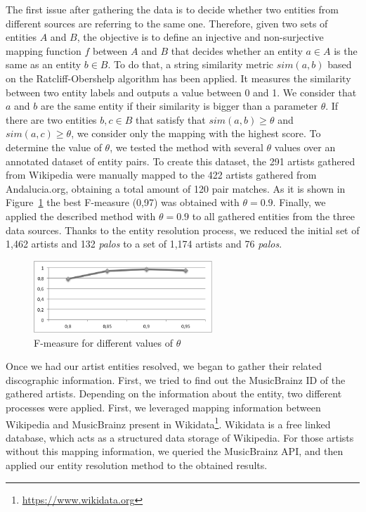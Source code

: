 The first issue after gathering the data is to decide whether two entities from different sources are referring to the same one. Therefore, given two sets of entities $A$ and $B$, the objective is to define an injective and non-surjective mapping function $f$ between $A$ and $B$ that decides whether an entity $a \in A$ is the same as an entity $b \in B$. To do that, a string similarity metric $sim(a,b)$ based on the Ratcliff-Obershelp algorithm \citep{Ratcliff1988} has been applied. It measures the similarity between two entity labels and outputs a value between 0 and 1. We consider that $a$ and $b$ are the same entity if their similarity is bigger than a parameter $\theta$. If there are two entities $b, c \in B$ that satisfy that $sim(a,b) \geq \theta$ and $sim(a,c) \geq \theta$, we consider only the mapping with the highest score. To determine the value of $\theta$, we tested the method with several $\theta$ values over an annotated dataset of entity pairs. To create this dataset, the 291 artists gathered from Wikipedia were manually mapped to the 422 artists gathered from Andalucia.org, obtaining a total amount of 120 pair matches. As it is shown in Figure~\ref{fig:musicology:fmeasure} the best F-measure (0,97) was obtained with $\theta=0.9$. Finally, we applied the described method with $\theta=0.9$ to all gathered entities from the three data sources. Thanks to the entity resolution process, we reduced the initial set of 1,462 artists and 132 \textit{palos} to a set of 1,174 artists and 76 \textit{palos}.

\begin{figure}
	\centering
	\includegraphics[width=0.60\textwidth]{ch05_musicology_pics/similarity_f_bn.png}
	\caption{F-measure for different values of $\theta$ \label{fig:musicology:fmeasure}}
\end{figure}

Once we had our artist entities resolved, we began to gather their related discographic information. First, we tried to find out the MusicBrainz ID of the gathered artists. Depending on the information about the entity, two different processes were applied. First, we leveraged mapping information between Wikipedia and MusicBrainz present in Wikidata\footnote{\url{https://www.wikidata.org}}. Wikidata is a free linked database, which acts as a structured data storage of Wikipedia. %
For those artists without this mapping information, we queried the MusicBrainz API, and then applied our entity resolution method to the obtained results.

